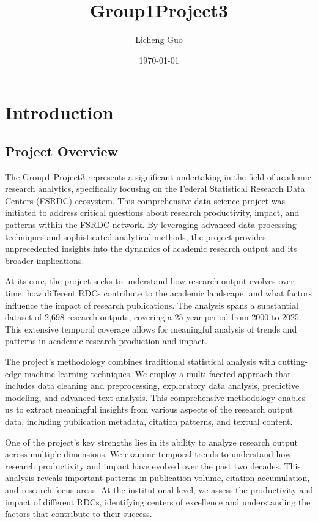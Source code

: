 \documentclass[12pt]{article}
\title{Group1Project3}
\author{Licheng Guo}
\date{\today}
\begin{document}
\maketitle

\tableofcontents
\newpage

\section{Introduction}

\subsection{Project Overview}
The Group1 Project3 represents a significant undertaking in the field of academic research analytics, specifically focusing on the Federal Statistical Research Data Centers (FSRDC) ecosystem. This comprehensive data science project was initiated to address critical questions about research productivity, impact, and patterns within the FSRDC network. By leveraging advanced data processing techniques and sophisticated analytical methods, the project provides unprecedented insights into the dynamics of academic research output and its broader implications.

At its core, the project seeks to understand how research output evolves over time, how different RDCs contribute to the academic landscape, and what factors influence the impact of research publications. The analysis spans a substantial dataset of 2,698 research outputs, covering a 25-year period from 2000 to 2025. This extensive temporal coverage allows for meaningful analysis of trends and patterns in academic research production and impact.

The project's methodology combines traditional statistical analysis with cutting-edge machine learning techniques. We employ a multi-faceted approach that includes data cleaning and preprocessing, exploratory data analysis, predictive modeling, and advanced text analysis. This comprehensive methodology enables us to extract meaningful insights from various aspects of the research output data, including publication metadata, citation patterns, and textual content.

One of the project's key strengths lies in its ability to analyze research output across multiple dimensions. We examine temporal trends to understand how research productivity and impact have evolved over the past two decades. This analysis reveals important patterns in publication volume, citation accumulation, and research focus areas. At the institutional level, we assess the productivity and impact of different RDCs, identifying centers of excellence and understanding the factors that contribute to their success.
\end{document}
